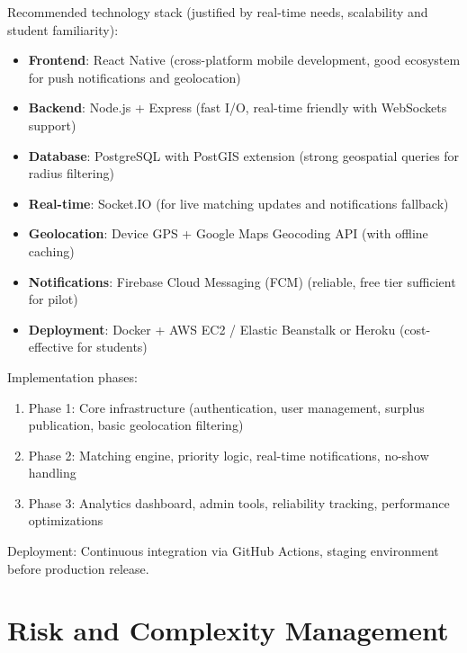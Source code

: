\documentclass[conference]{IEEEtran}
\begin{document}
Recommended technology stack (justified by real-time needs, scalability and student familiarity):
\begin{itemize}
    \item \textbf{Frontend}: React Native (cross-platform mobile development, good ecosystem for push notifications and geolocation)
    \item \textbf{Backend}: Node.js + Express (fast I/O, real-time friendly with WebSockets support)
    \item \textbf{Database}: PostgreSQL with PostGIS extension (strong geospatial queries for radius filtering)
    \item \textbf{Real-time}: Socket.IO (for live matching updates and notifications fallback)
    \item \textbf{Geolocation}: Device GPS + Google Maps Geocoding API (with offline caching)
    \item \textbf{Notifications}: Firebase Cloud Messaging (FCM) (reliable, free tier sufficient for pilot)
    \item \textbf{Deployment}: Docker + AWS EC2 / Elastic Beanstalk or Heroku (cost-effective for students)
\end{itemize}

Implementation phases:
\begin{enumerate}
    \item Phase 1: Core infrastructure (authentication, user management, surplus publication, basic geolocation filtering)
    \item Phase 2: Matching engine, priority logic, real-time notifications, no-show handling
    \item Phase 3: Analytics dashboard, admin tools, reliability tracking, performance optimizations
\end{enumerate}

Deployment: Continuous integration via GitHub Actions, staging environment before production release.

\section{Risk and Complexity Management}
\end{document}
